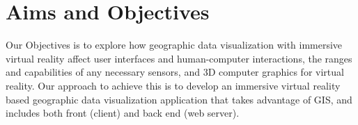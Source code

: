 \section{Aims and Objectives}

Our Objectives is to explore how geographic data visualization with immersive virtual reality affect user interfaces and human-computer interactions, the ranges and capabilities of any necessary sensors, and 3D computer graphics for virtual reality. Our approach to achieve this is to develop an immersive virtual reality based geographic data visualization application that takes advantage of GIS, and includes both front (client) and back end (web server).

